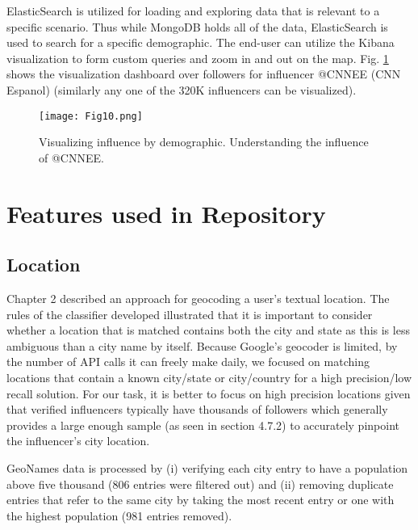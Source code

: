 \iffalse
\begin{figure}[htbp]
\centerline{\texttt{[image: Fig7.png]}}
\caption[Top influencers of Turkish speakers]{Top 10 Influencers with mostly Turkish speaking audience.}
\label{fig_ch7_4}
\end{figure}
\fi

ElasticSearch is utilized for loading and exploring data that is relevant to a specific scenario. Thus while MongoDB holds all of the data, ElasticSearch is used to search for a specific demographic. The end-user can utilize the Kibana visualization to form custom queries and zoom in and out on the map. Fig. \ref{fig_ch7_5} shows the visualization dashboard over followers for influencer @CNNEE (CNN Espanol) (similarly any one of the 320K influencers can be visualized).

\begin{figure}[htbp]
\centerline{\texttt{[image: Fig10.png]}}
\caption[Visualizing influence by demographic]{Visualizing influence by demographic. Understanding the influence of @CNNEE.}
\label{fig_ch7_5}
\end{figure}

\section{Features used in Repository}
\subsection{Location}
Chapter 2 described an approach for geocoding a user's textual location. The rules of the classifier developed illustrated that it is important to consider whether a location that is matched contains both the city and state as this is less ambiguous than a city name by itself. Because Google's geocoder is limited, by the number of API calls it can freely make daily, we focused on matching locations that contain a known city/state or city/country for a high precision/low recall solution. For our task, it is better to focus on high precision locations given that verified influencers typically have thousands of followers which generally provides a large enough sample (as seen in section 4.7.2) to accurately pinpoint the influencer's city location.

GeoNames data is processed by (i) verifying each city entry to have a population above five thousand (806 entries were filtered out) and (ii) removing duplicate entries that refer to the same city by taking the most recent entry or one with the highest population (981 entries removed).

